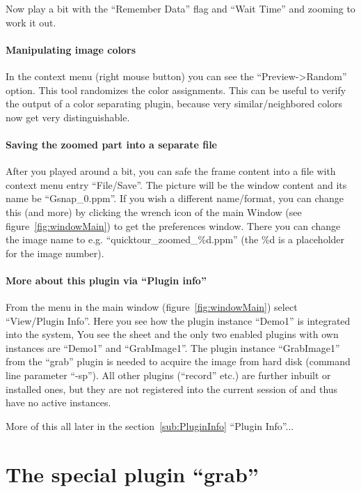 Now play a bit with the ``Remember Data'' flag and ``Wait Time'' and
zooming to work it out.

\paragraph{Manipulating image colors}

In the context menu (right mouse button) you can see the
``Preview-\textgreater{}Random'' option. This tool randomizes the
color assignments. This can be useful to verify the output of a
color separating plugin, because very similar/neighbored colors now
get very distinguishable.

\paragraph{Saving the zoomed part into a separate file}

After you played around a bit, you can safe the frame content into a
file with context menu entry ``File/Save''. The picture will be the
window content and its name be ``Gsnap\_0.ppm''. If you wish a
different name/format, you can change this (and more) by clicking
the wrench icon of the main Window (see figure~\ref{fig:windowMain}) to
get the preferences window. There you can change the image name to
e.g. ``quicktour\_zoomed\_\%d.ppm'' (the \%d is a placeholder for
the image number).

\paragraph{More about this plugin via ``Plugin info''}

From the menu in the main window (figure~\ref{fig:windowMain})
select ``View/Plugin Info''. Here you see how the plugin instance
``Demo1'' is integrated into the \icewing{} system, You see the
sheet and the only two enabled plugins with own instances are
``Demo1'' and ``GrabImage1''. The plugin instance ``GrabImage1''
from the ``grab'' plugin is needed to acquire the image from hard
disk (command line parameter ``-sp''). All other plugins (``record''
etc.) are further inbuilt or installed ones, but they are not
registered into the current session of \icewing{} and thus have no
active instances.

More of this all later in the section~\ref{sub:PluginInfo} ``Plugin
Info''...

\section{The special plugin ``grab''}

